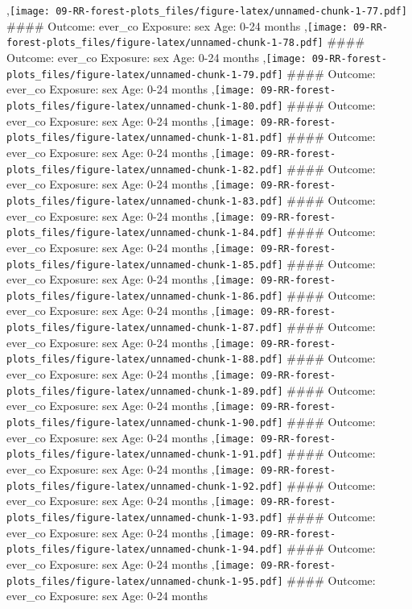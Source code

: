 \documentclass[
  9pt,
]{book}
\begin{document}
,\texttt{[image: 09-RR-forest-plots\_files/figure-latex/unnamed-chunk-1-77.pdf]}
\#\#\#\# Outcome: ever\_co Exposure: sex Age: 0-24 months
,\texttt{[image: 09-RR-forest-plots\_files/figure-latex/unnamed-chunk-1-78.pdf]}
\#\#\#\# Outcome: ever\_co Exposure: sex Age: 0-24 months
,\texttt{[image: 09-RR-forest-plots\_files/figure-latex/unnamed-chunk-1-79.pdf]}
\#\#\#\# Outcome: ever\_co Exposure: sex Age: 0-24 months
,\texttt{[image: 09-RR-forest-plots\_files/figure-latex/unnamed-chunk-1-80.pdf]}
\#\#\#\# Outcome: ever\_co Exposure: sex Age: 0-24 months
,\texttt{[image: 09-RR-forest-plots\_files/figure-latex/unnamed-chunk-1-81.pdf]}
\#\#\#\# Outcome: ever\_co Exposure: sex Age: 0-24 months
,\texttt{[image: 09-RR-forest-plots\_files/figure-latex/unnamed-chunk-1-82.pdf]}
\#\#\#\# Outcome: ever\_co Exposure: sex Age: 0-24 months
,\texttt{[image: 09-RR-forest-plots\_files/figure-latex/unnamed-chunk-1-83.pdf]}
\#\#\#\# Outcome: ever\_co Exposure: sex Age: 0-24 months
,\texttt{[image: 09-RR-forest-plots\_files/figure-latex/unnamed-chunk-1-84.pdf]}
\#\#\#\# Outcome: ever\_co Exposure: sex Age: 0-24 months
,\texttt{[image: 09-RR-forest-plots\_files/figure-latex/unnamed-chunk-1-85.pdf]}
\#\#\#\# Outcome: ever\_co Exposure: sex Age: 0-24 months
,\texttt{[image: 09-RR-forest-plots\_files/figure-latex/unnamed-chunk-1-86.pdf]}
\#\#\#\# Outcome: ever\_co Exposure: sex Age: 0-24 months
,\texttt{[image: 09-RR-forest-plots\_files/figure-latex/unnamed-chunk-1-87.pdf]}
\#\#\#\# Outcome: ever\_co Exposure: sex Age: 0-24 months
,\texttt{[image: 09-RR-forest-plots\_files/figure-latex/unnamed-chunk-1-88.pdf]}
\#\#\#\# Outcome: ever\_co Exposure: sex Age: 0-24 months
,\texttt{[image: 09-RR-forest-plots\_files/figure-latex/unnamed-chunk-1-89.pdf]}
\#\#\#\# Outcome: ever\_co Exposure: sex Age: 0-24 months
,\texttt{[image: 09-RR-forest-plots\_files/figure-latex/unnamed-chunk-1-90.pdf]}
\#\#\#\# Outcome: ever\_co Exposure: sex Age: 0-24 months
,\texttt{[image: 09-RR-forest-plots\_files/figure-latex/unnamed-chunk-1-91.pdf]}
\#\#\#\# Outcome: ever\_co Exposure: sex Age: 0-24 months
,\texttt{[image: 09-RR-forest-plots\_files/figure-latex/unnamed-chunk-1-92.pdf]}
\#\#\#\# Outcome: ever\_co Exposure: sex Age: 0-24 months
,\texttt{[image: 09-RR-forest-plots\_files/figure-latex/unnamed-chunk-1-93.pdf]}
\#\#\#\# Outcome: ever\_co Exposure: sex Age: 0-24 months
,\texttt{[image: 09-RR-forest-plots\_files/figure-latex/unnamed-chunk-1-94.pdf]}
\#\#\#\# Outcome: ever\_co Exposure: sex Age: 0-24 months
,\texttt{[image: 09-RR-forest-plots\_files/figure-latex/unnamed-chunk-1-95.pdf]}
\#\#\#\# Outcome: ever\_co Exposure: sex Age: 0-24 months
\end{document}
